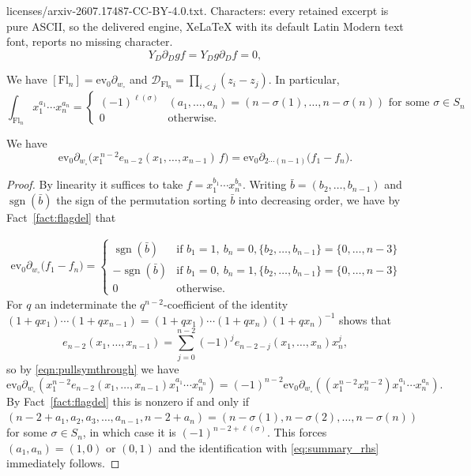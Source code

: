 \documentclass[10pt,a4paper]{amsart}
\newcommand{\ct}{\operatorname{ev_0}} %
\newcommand{\fl}[1]{\mathrm{Fl}_{#1}}
\newcommand{\sgn}{\operatorname{sgn}}
\begin{document}
licenses/arxiv-2607.17487-CC-BY-4.0.txt. Characters: every retained excerpt is pure ASCII, so the delivered engine, XeLaTeX with its default Latin Modern text font, reports no missing character.
\begin{equation}
\label{eqn:pullsymthrough}Y_D\partial_D gf=Y_Dg\partial_Df=0,\end{equation}

\begin{fact}
\label{fact:flagdel}
   We have
   $[\fl{n}]=\ct\partial_{w_{\circ}}$ and $\mathcal{D}_{\fl{n}}=\prod_{i<j}(z_i-z_j)$. In particular, $$\int_{\fl{n}}x_1^{a_1}\cdots x_n^{a_n}=\begin{cases}(-1)^{\ell(\sigma)}&(a_1,\ldots,a_n)=(n-\sigma(1),\ldots,n-\sigma(n))\text{ for some }\sigma\in S_n\\0&\text{otherwise.}\end{cases}$$
\end{fact}

\begin{lem}\label{lem:nest}
We have\[
 \ct\partial_{w_{\circ}}\big(x_1^{\,n-2}e_{n-2}(x_1,\dots,x_{n-1})\,f\big)=\ct\partial_{2\cdots(n-1)}\big(f_1-f_n\big).
\]
\end{lem}

\begin{proof}
By linearity it suffices to take $f=x_1^{b_1}\cdots x_n^{b_n}$. Writing $\bar b=(b_2,\dots,b_{n-1})$ and $\sgn(\bar
b)$ the sign of the permutation sorting $\bar b$ into decreasing order, we have by Fact~\ref{fact:flagdel} that

\begin{align}\label{eq:summary_rhs}
\ct\partial_{w_{\circ}}\big(f_1-f_n\big)=
\begin{cases}
\sgn(\bar b) & \text{if } b_1=1,\ b_n=0, \{b_2,\dots,b_{n-1}\}=\{0,\dots,n-3\}\\[2pt]
-\sgn({\bar b}) & \text{if } b_1=0,\ b_n=1, \{b_2,\dots,b_{n-1}\}=\{0,\dots,n-3\}\\[2pt]
0 & \text{otherwise.}
\end{cases}
\end{align}
    For $q$ an indeterminate the $q^{n-2}$-coefficient of the identity
    $(1+qx_1)\cdots(1+qx_{n-1})=(1+qx_1)\cdots (1+qx_n)(1+qx_n)^{-1}$ shows that
    $$e_{n-2}(x_1,\ldots,x_{n-1})=\sum_{j=0}^{n-2}(-1)^je_{n-2-j}(x_1,\ldots,x_n)x_n^j,$$
    so by \eqref{eqn:pullsymthrough} we have
    $$\ct\partial_{w_\circ}(x_1^{n-2}e_{n-2}(x_1,\ldots,x_{n-1})x_1^{a_1}\cdots x_n^{a_n})=(-1)^{n-2}\ct\partial_{w_{\circ}}((x_1^{n-2}x_{n}^{n-2})x_1^{a_1}\cdots x_n^{a_n}).$$
    By Fact~\ref{fact:flagdel} this is nonzero if and only if $(n-2+a_1,a_2,a_3,\ldots,a_{n-1},n-2+a_n)=(n-\sigma(1),n-\sigma(2),\ldots,n-\sigma(n))$ for some $\sigma\in S_n$, in which case it is $(-1)^{n-2+\ell(\sigma)}$. This forces $(a_1,a_n)=(1,0)$ or $(0,1)$ and the identification with \eqref{eq:summary_rhs} immediately follows.
\end{proof}
\end{document}
